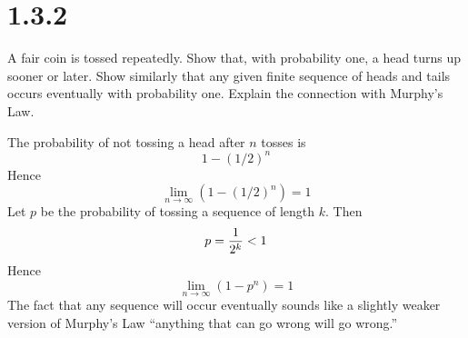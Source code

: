 \section*{1.3.2}
A fair coin is tossed repeatedly.
Show that, with probability one, a head turns up sooner or later.
Show similarly that any given finite sequence of heads and tails
occurs eventually with probability one.
Explain the connection with Murphy's Law.

\bigskip
\noindent
The probability of not tossing a head after $n$ tosses is
$$1-(1/2)^n$$
Hence
$$\lim_{n\to\infty}(1-(1/2)^n)=1$$
Let $p$ be the probability of tossing a sequence of length $k$.
Then
$$p={1\over2^k}<1$$
Hence
$$\lim_{n\to\infty}(1-p^n)=1$$
The fact that any sequence will occur eventually sounds like a
slightly weaker version of Murphy's Law ``anything that can go wrong will go wrong.''
